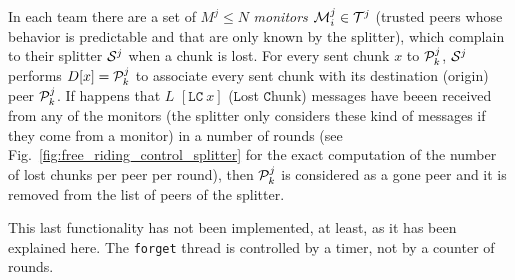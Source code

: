 In each team there are a set of $M^j\leq N$ \emph{monitors} ${\cal
M}^j_i\in {\cal T}^j$ (trusted peers whose behavior is predictable and
that are only known by the splitter), which complain to their splitter
${\cal S}^j$ when a chunk is lost. For every sent chunk $x$ to ${\cal
P}^j_k$, ${\cal S}^j$ performs $D[x]={\cal P}^j_k$ to associate every
sent chunk with its destination (origin) peer ${\cal P}^j_k$. If
happens that $L$ $[\mathtt{LC}~x]$ ($\mathtt{L}$ost $\mathtt{C}$hunk)
messages have beeen received from any of the monitors (the splitter
only considers these kind of messages if they come from a monitor) in
a number of rounds (see Fig.~\ref{fig:free_riding_control_splitter}
for the exact computation of the number of lost chunks per peer per
round), then ${\cal P}^j_k$ is considered as a gone peer and it is
removed from the list of peers of the splitter.

\begin{notex}
This last functionality has not been implemented, at least, as it has been explained here. The \texttt{forget} thread is controlled by a timer, not by a counter of rounds.
\end{notex}

